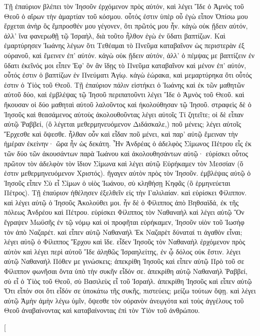 \begin{pages}
\begin{Rightside}
		\pend
		\pstart
		Τῇ ἐπαύριον βλέπει τὸν Ἰησοῦν ἐρχόμενον πρὸς αὐτόν, καὶ λέγει Ἴδε ὁ Ἀμνὸς τοῦ Θεοῦ ὁ αἴρων τὴν ἁμαρτίαν τοῦ κόσμου. οὗτός ἐστιν ὑπὲρ οὗ ἐγὼ εἶπον Ὀπίσω μου ἔρχεται ἀνὴρ ὃς ἔμπροσθέν μου γέγονεν, ὅτι πρῶτός μου ἦν. κἀγὼ οὐκ ᾔδειν αὐτόν, ἀλλ’ ἵνα φανερωθῇ τῷ Ἰσραὴλ, διὰ τοῦτο ἦλθον ἐγὼ ἐν ὕδατι βαπτίζων. Καὶ ἐμαρτύρησεν Ἰωάνης λέγων ὅτι Τεθέαμαι τὸ Πνεῦμα καταβαῖνον ὡς περιστερὰν ἐξ οὐρανοῦ, καὶ ἔμεινεν ἐπ’ αὐτόν. κἀγὼ οὐκ ᾔδειν αὐτόν, ἀλλ’ ὁ πέμψας με βαπτίζειν ἐν ὕδατι ἐκεῖνός μοι εἶπεν Ἐφ’ ὃν ἂν ἴδῃς τὸ Πνεῦμα καταβαῖνον καὶ μένον ἐπ’ αὐτόν, οὗτός ἐστιν ὁ βαπτίζων ἐν Πνεύματι Ἁγίῳ. κἀγὼ ἑώρακα, καὶ μεμαρτύρηκα ὅτι οὗτός ἐστιν ὁ Υἱὸς τοῦ Θεοῦ.
		\pend
		\pstart
		Τῇ ἐπαύριον πάλιν εἱστήκει ὁ Ἰωάνης καὶ ἐκ τῶν μαθητῶν αὐτοῦ δύο, καὶ ἐμβλέψας τῷ Ἰησοῦ περιπατοῦντι λέγει Ἴδε ὁ Ἀμνὸς τοῦ Θεοῦ. καὶ ἤκουσαν οἱ δύο μαθηταὶ αὐτοῦ λαλοῦντος καὶ ἠκολούθησαν τῷ Ἰησοῦ. στραφεὶς δὲ ὁ Ἰησοῦς καὶ θεασάμενος αὐτοὺς ἀκολουθοῦντας λέγει αὐτοῖς Τί ζητεῖτε; οἱ δὲ εἶπαν αὐτῷ Ῥαββεί, (ὃ λέγεται μεθερμηνευόμενον Διδάσκαλε,) ποῦ μένεις; λέγει αὐτοῖς Ἔρχεσθε καὶ ὄψεσθε. ἦλθαν οὖν καὶ εἶδαν ποῦ μένει, καὶ παρ’ αὐτῷ ἔμειναν τὴν ἡμέραν ἐκείνην· ὥρα ἦν ὡς δεκάτη. Ἦν Ἀνδρέας ὁ ἀδελφὸς Σίμωνος Πέτρου εἷς ἐκ τῶν δύο τῶν ἀκουσάντων παρὰ Ἰωάνου καὶ ἀκολουθησάντων αὐτῷ· εὑρίσκει οὗτος πρῶτον τὸν ἀδελφὸν τὸν ἴδιον Σίμωνα καὶ λέγει αὐτῷ Εὑρήκαμεν τὸν Μεσσίαν (ὅ ἐστιν μεθερμηνευόμενον Χριστός). ἤγαγεν αὐτὸν πρὸς τὸν Ἰησοῦν. ἐμβλέψας αὐτῷ ὁ Ἰησοῦς εἶπεν Σὺ εἶ Σίμων ὁ υἱὸς Ἰωάνου, σὺ κληθήσῃ Κηφᾶς (ὃ ἑρμηνεύεται Πέτρος). 
		\pend
		\pstart
		Τῇ ἐπαύριον ἠθέλησεν ἐξελθεῖν εἰς τὴν Γαλιλαίαν. καὶ εὑρίσκει Φίλιππον. καὶ λέγει αὐτῷ ὁ Ἰησοῦς Ἀκολούθει μοι. ἦν δὲ ὁ Φίλιππος ἀπὸ Βηθσαϊδά, ἐκ τῆς πόλεως Ἀνδρέου καὶ Πέτρου. εὑρίσκει Φίλιππος τὸν Ναθαναὴλ καὶ λέγει αὐτῷ Ὃν ἔγραψεν Μωϋσῆς ἐν τῷ νόμῳ καὶ οἱ προφῆται εὑρήκαμεν, Ἰησοῦν υἱὸν τοῦ Ἰωσὴφ τὸν ἀπὸ Ναζαρέτ. καὶ εἶπεν αὐτῷ Ναθαναήλ Ἐκ Ναζαρὲτ δύναταί τι ἀγαθὸν εἶναι; λέγει αὐτῷ ὁ Φίλιππος Ἔρχου καὶ ἴδε. εἶδεν Ἰησοῦς τὸν Ναθαναὴλ ἐρχόμενον πρὸς αὐτὸν καὶ λέγει περὶ αὐτοῦ Ἴδε ἀληθῶς Ἰσραηλείτης, ἐν ᾧ δόλος οὐκ ἔστιν. λέγει αὐτῷ Ναθαναήλ Πόθεν με γινώσκεις; ἀπεκρίθη Ἰησοῦς καὶ εἶπεν αὐτῷ Πρὸ τοῦ σε Φίλιππον φωνῆσαι ὄντα ὑπὸ τὴν συκῆν εἶδόν σε. ἀπεκρίθη αὐτῷ Ναθαναήλ Ῥαββεί, σὺ εἶ ὁ Υἱὸς τοῦ Θεοῦ, σὺ Βασιλεὺς εἶ τοῦ Ἰσραήλ. ἀπεκρίθη Ἰησοῦς καὶ εἶπεν αὐτῷ Ὅτι εἶπόν σοι ὅτι εἶδόν σε ὑποκάτω τῆς συκῆς, πιστεύεις; μείζω τούτων ὄψῃ. καὶ λέγει αὐτῷ Ἀμὴν ἀμὴν λέγω ὑμῖν, ὄψεσθε τὸν οὐρανὸν ἀνεῳγότα καὶ τοὺς ἀγγέλους τοῦ Θεοῦ ἀναβαίνοντας καὶ καταβαίνοντας ἐπὶ τὸν Υἱὸν τοῦ ἀνθρώπου.		
		\pend
        \endnumbering
    \end{Rightside}
    \begin{Leftside}
        \beginnumbering
        \pstart[

\end{Leftside}
\end{pages}
